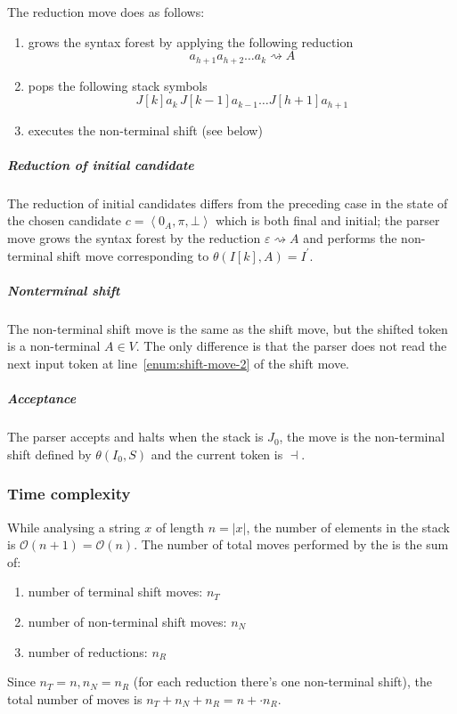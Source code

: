 \documentclass[english]{article}
\begin{document}
The reduction move does as follows:

\begin{enumerate}
  \item grows the syntax forest by applying the following reduction
        \[ a_{h+1} a_{h+2} \ldots a_k \rightsquigarrow A \]
  \item pops the following stack symbols
        \[ J[k] a_k \, J[k-1] a_{k-1} \ldots J[h+1] a_{h+1} \]
  \item executes the non-terminal shift (see below)
\end{enumerate}

\subparagraph*{Reduction of initial candidate}

The reduction of initial candidates differs from the preceding case in the state of the chosen candidate \(c = \left\langle 0_A, \pi, \bot \right\rangle\) which is both final and initial;
the parser move grows the syntax forest by the reduction \(\varepsilon \rightsquigarrow A\) and performs the non-terminal shift move corresponding to \(\theta(I[k], A) = I^\prime\).

\subparagraph*{Nonterminal shift}

The non-terminal shift move is the same as the shift move, but the shifted token is a non-terminal \(A \in V\).
The only difference is that the parser does not read the next input token at line~\ref{enum:shift-move-2} of the shift move.

\subparagraph*{Acceptance}
The parser accepts and halts when the stack is \(J_0\), the move is the non-terminal shift defined by \(\theta(I_0, S)\) and the current token is \(\dashv\).

\subsubsection{Time complexity}

While analysing a string \(x\) of length \(n = |x|\), the number of elements in the stack is \(\mathcal{O}(n+1)=\mathcal{O}(n)\).
The number of total moves performed by the \PDA is the sum of:

\begin{enumerate}
  \item number of terminal shift moves: \(n_T\)
  \item number of non-terminal shift moves: \(n_N\)
  \item number of reductions: \(n_R\)
\end{enumerate}

Since \(n_T = n, n_N=n_R\) (for each reduction there's one non-terminal shift), the total number of moves is \(n_T + n_N + n_R = n +  \cdot n_R\).
\end{document}
